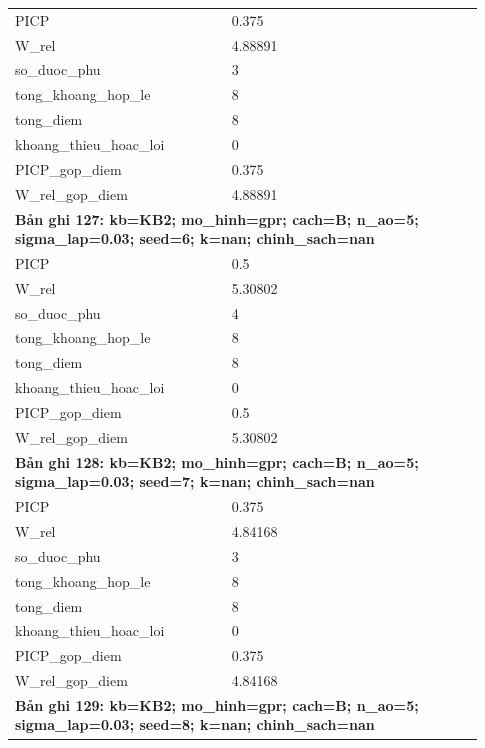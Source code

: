 \begin{longtable}{p{0.43\linewidth}p{0.50\linewidth}}
PICP & 0.375 \\
W\_\allowbreak rel & 4.88891 \\
so\_\allowbreak duoc\_\allowbreak phu & 3 \\
tong\_\allowbreak khoang\_\allowbreak hop\_\allowbreak le & 8 \\
tong\_\allowbreak diem & 8 \\
khoang\_\allowbreak thieu\_\allowbreak hoac\_\allowbreak loi & 0 \\
PICP\_\allowbreak gop\_\allowbreak diem & 0.375 \\
W\_\allowbreak rel\_\allowbreak gop\_\allowbreak diem & 4.88891 \\
\midrule
\multicolumn{2}{p{0.95\linewidth}}{\textbf{Bản ghi 127: kb=KB2; mo\_hinh=gpr; cach=B; n\_ao=5; sigma\_lap=0.03; seed=6; k=nan; chinh\_sach=nan}} \\
PICP & 0.5 \\
W\_\allowbreak rel & 5.30802 \\
so\_\allowbreak duoc\_\allowbreak phu & 4 \\
tong\_\allowbreak khoang\_\allowbreak hop\_\allowbreak le & 8 \\
tong\_\allowbreak diem & 8 \\
khoang\_\allowbreak thieu\_\allowbreak hoac\_\allowbreak loi & 0 \\
PICP\_\allowbreak gop\_\allowbreak diem & 0.5 \\
W\_\allowbreak rel\_\allowbreak gop\_\allowbreak diem & 5.30802 \\
\midrule
\multicolumn{2}{p{0.95\linewidth}}{\textbf{Bản ghi 128: kb=KB2; mo\_hinh=gpr; cach=B; n\_ao=5; sigma\_lap=0.03; seed=7; k=nan; chinh\_sach=nan}} \\
PICP & 0.375 \\
W\_\allowbreak rel & 4.84168 \\
so\_\allowbreak duoc\_\allowbreak phu & 3 \\
tong\_\allowbreak khoang\_\allowbreak hop\_\allowbreak le & 8 \\
tong\_\allowbreak diem & 8 \\
khoang\_\allowbreak thieu\_\allowbreak hoac\_\allowbreak loi & 0 \\
PICP\_\allowbreak gop\_\allowbreak diem & 0.375 \\
W\_\allowbreak rel\_\allowbreak gop\_\allowbreak diem & 4.84168 \\
\midrule
\multicolumn{2}{p{0.95\linewidth}}{\textbf{Bản ghi 129: kb=KB2; mo\_hinh=gpr; cach=B; n\_ao=5; sigma\_lap=0.03; seed=8; k=nan; chinh\_sach=nan}} \\

\end{longtable}
